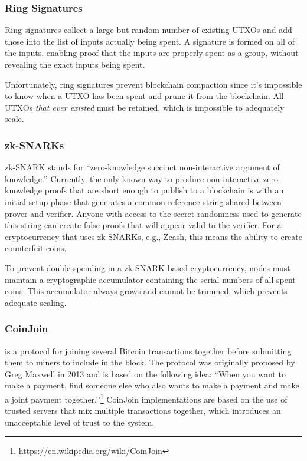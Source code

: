 \documentclass[8pt,fleqn,openany]{book}
\begin{document}
	\subsubsection{Ring Signatures} Ring signatures collect a large but random number of existing UTXOs and add those into the list of inputs actually being spent. A signature is formed on all of the inputs, enabling proof that the inputs are properly spent as a group, without revealing the exact inputs being spent. 
	
	Unfortunately, ring signatures prevent blockchain compaction since it’s impossible to know when a UTXO has been spent and prune it from the blockchain. All UTXOs \textit{that ever existed} must be retained, which is impossible to adequately scale.
	
	\subsubsection{zk-SNARKs} zk-SNARK stands for ``zero-knowledge succinct non-interactive argument of knowledge.’’ Currently, the only known way to produce non-interactive zero-knowledge proofs that are short enough to publish to a blockchain is with an initial setup phase that generates a common reference string shared between prover and verifier. Anyone with access to the secret randomness used to generate this string can create false proofs that will appear valid to the verifier. For a cryptocurrency that uses zk-SNARKs, e.g., Zcash, this means the ability to create counterfeit coins. 
	
	To prevent double-spending in a zk-SNARK-based cryptocurrency, nodes must maintain a cryptographic accumulator containing the serial numbers of all spent coins. This accumulator always grows and cannot be trimmed, which prevents adequate scaling.
	
	\subsubsection{CoinJoin} is a protocol for joining several Bitcoin transactions together before submitting them to miners to include in the block. The protocol was originally proposed by Greg Maxwell in 2013 and is based on the following idea: ``When you want to make a payment, find someone else who also wants to make a payment and make a joint payment together.’’\footnote{https://en.wikipedia.org/wiki/CoinJoin} CoinJoin implementations are based on the use of trusted servers that mix multiple transactions together, which introduces an unacceptable level of trust to the system.
	
\end{document}
